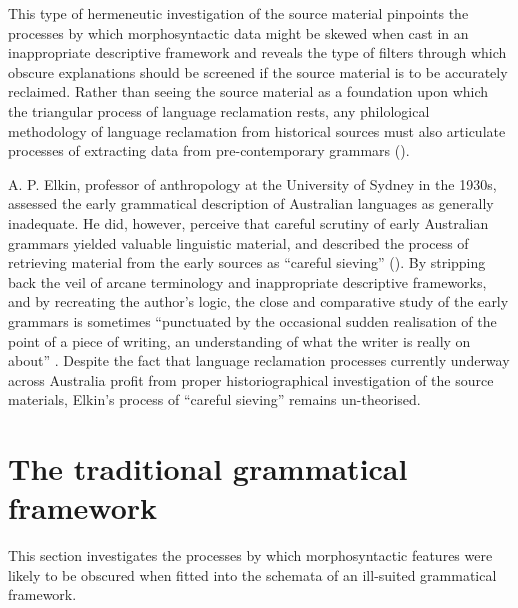 This type of hermeneutic investigation of the source material pinpoints the processes by which morphosyntactic data might be skewed when cast in an inappropriate descriptive framework and reveals the type of filters through which obscure explanations should be screened if the source material is to be accurately reclaimed. Rather than seeing the source material as a foundation upon which the triangular process of language reclamation rests, any philological methodology of language reclamation from historical sources must also articulate processes of extracting data from pre-contemporary grammars ().

A. P. Elkin, professor of anthropology at the University of Sydney in the 1930s, assessed the early grammatical description of Australian languages as generally inadequate. He did, however, perceive that careful scrutiny of early Australian grammars yielded valuable linguistic material, and described the process of retrieving material from the early sources as “careful sieving” (\citeyear[9]{elkin_nature_1937}). By stripping back the veil of arcane terminology and inappropriate descriptive frameworks, and by recreating the author’s logic, the close and comparative study of the early grammars is sometimes “punctuated by the occasional sudden realisation of the point of a piece of writing, an understanding of what the writer is really on about” \citep[2]{mcgregor_introduction_2008}. Despite the fact that language reclamation processes currently underway across Australia profit from proper historiographical investigation of the source materials, Elkin’s process of “careful sieving” remains un-theorised.

\section{The traditional grammatical framework }
\label{sec:key:2.2}

This section investigates the processes by which morphosyntactic features were likely to be obscured when fitted into the schemata of an ill-suited grammatical framework.

